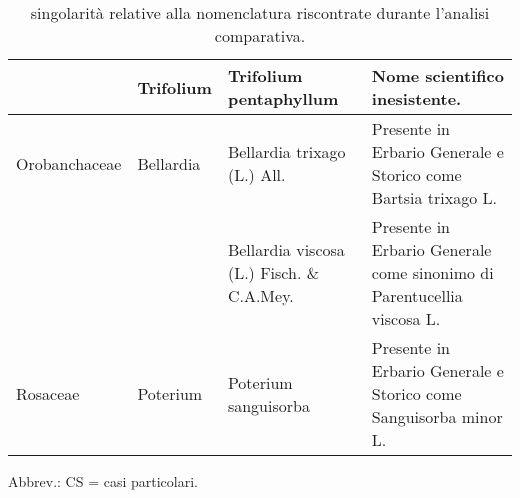 \documentclass[main.tex]{subfiles}
\begin{document}
\begin{table}[!ht]
\begin{tabular}[\footnotesize]{|l|l|p{5cm}|p{5.5cm}|}
        ~ & Trifolium & Trifolium pentaphyllum & Nome scientifico inesistente. \\ \hline
        Orobanchaceae & Bellardia & Bellardia trixago (L.) All. & Presente in Erbario Generale e Storico come Bartsia trixago L. \\ \hline
        ~ & ~ & Bellardia viscosa (L.) Fisch. \& C.A.Mey. & Presente in Erbario Generale come sinonimo di Parentucellia viscosa L. \\ \hline
        Rosaceae & Poterium & Poterium sanguisorba & Presente in Erbario Generale e Storico come Sanguisorba minor L. \\ \hline
    \end{tabular}
        \caption{singolarità relative alla nomenclatura riscontrate durante l’analisi comparativa.}
    \label{tab:11}
\end{table}

Abbrev.: CS = casi particolari.

\clearpage
\end{document}
